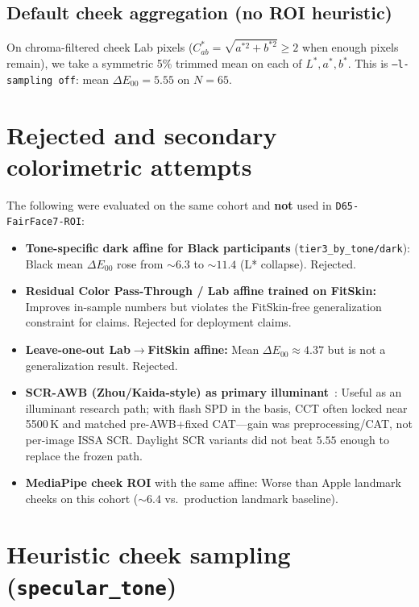 \documentclass[11pt]{article}
\newcommand{\deee}{\ensuremath{\Delta E_{00}}}
\newcommand{\pipename}{\texttt{D65-FairFace7-ROI}}
\begin{document}
\subsection{Default cheek aggregation (no ROI heuristic)}
On chroma-filtered cheek Lab pixels ($C_{ab}^*=\sqrt{a^{*2}+b^{*2}}\ge 2$ when enough pixels remain), we take a symmetric 5\% trimmed mean on each of $L^*,a^*,b^*$.
This is \texttt{--l-sampling off}: mean $\deee=\num{5.55}$ on $N=65$.

\section{Rejected and secondary colorimetric attempts}
\label{sec:rejected}

The following were evaluated on the same cohort and \textbf{not} used in \pipename{}:

\begin{itemize}[leftmargin=*]
  \item \textbf{Tone-specific dark affine for Black participants} (\texttt{tier3\_by\_tone/dark}):
    Black mean $\deee$ rose from ${\sim}6.3$ to ${\sim}11.4$ (L* collapse). Rejected.
  \item \textbf{Residual Color Pass-Through / Lab affine trained on FitSkin:}
    Improves in-sample numbers but violates the FitSkin-free generalization constraint for claims. Rejected for deployment claims.
  \item \textbf{Leave-one-out Lab$\to$FitSkin affine:}
    Mean $\deee\approx\num{4.37}$ but is not a generalization result. Rejected.
  \item \textbf{SCR-AWB (Zhou/Kaida-style) as primary illuminant}~\cite{zhou2025scr}:
    Useful as an illuminant research path; with flash SPD in the basis, CCT often locked near 5500\,K and matched pre-AWB+fixed CAT---gain was preprocessing/CAT, not per-image ISSA SCR.
    Daylight SCR variants did not beat $\num{5.55}$ enough to replace the frozen path.
  \item \textbf{MediaPipe cheek ROI} with the same affine:
    Worse than Apple landmark cheeks on this cohort (${\sim}6.4$ vs.\ production landmark baseline).
\end{itemize}

\section{Heuristic cheek sampling (\texttt{specular\_tone})}
\label{sec:roi}
\end{document}
